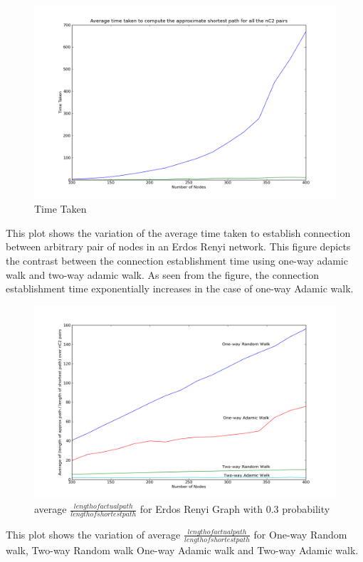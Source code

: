 \documentclass[a4paper,12pt]{article}
\begin{document}
\newpage
\begin{figure}[htp]
\centering
\includegraphics[scale=0.40]{Results/ERtime1Adamicand2Adamic.png}
\caption{Time Taken}
\label{ERtime1Adamicand2Adamic}
\end{figure}
This plot shows the variation of the average time taken to establish connection between arbitrary pair of nodes in an Erdos Renyi network. This figure depicts the contrast between the connection establishment time using one-way adamic walk and two-way adamic walk. As seen from the figure, the connection establishment time exponentially increases in the case of one-way Adamic walk.

\begin{figure}[htp]
\centering
\includegraphics[scale=0.40]{Results/ERratioall.png}
\caption{average $\frac{length of actual path}{length of shortest path}$ for Erdos Renyi Graph with 0.3 probability}
\label{ERratio-all}
\end{figure}
This plot shows the variation of average $\frac{length of actual path}{length of shortest path}$ for One-way Random walk, Two-way Random walk One-way Adamic walk and Two-way Adamic walk.
\end{document}
